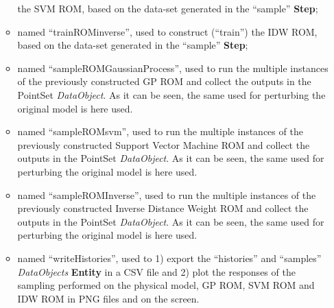 \begin{enumerate}
\begin{itemize}
     the SVM ROM, based on the data-set generated in the  ``sample'' \textbf{Step};
     \item {} named ``trainROMinverse'', used to construct (``train'')
     the IDW ROM, based on the data-set generated in the  ``sample'' \textbf{Step};
     \item {} named ``sampleROMGaussianProcess'', used to run the multiple  
     instances of the previously constructed GP ROM and 
     collect the outputs in the PointSet \textit{DataObject}. As it can be
     seen, the same  used for perturbing the original model is here used. 
     \item {} named ``sampleROMsvm'', used to run the multiple  
     instances of the previously constructed Support Vector Machine ROM and 
     collect the outputs in the PointSet \textit{DataObject}. As it can be
     seen, the same  used for perturbing the original model is here used.
     \item {} named ``sampleROMInverse'', used to run the multiple  
     instances of the previously constructed Inverse Distance Weight ROM and 
     collect the outputs in the PointSet \textit{DataObject}. As it can be
     seen, the same  used for perturbing the original model is here used.
     \item  {} named ``writeHistories'', used to 1) export 
     the ``histories'' and ``samples''  \textit{DataObjects} 
     \textbf{Entity} in a CSV file and 2) plot the responses of the sampling performed on the physical model, GP ROM,
     SVM ROM and IDW ROM in  PNG files and on the screen.
   \end{itemize}
\end{enumerate} 

